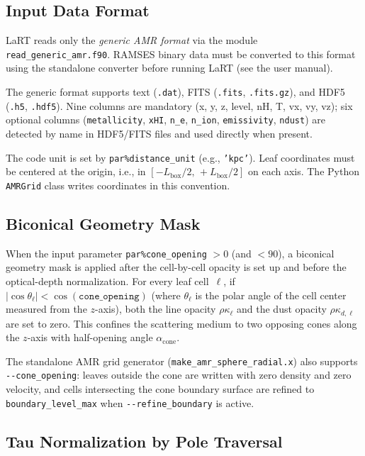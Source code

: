 \documentclass[english,a4paper]{my_memo}
\begin{document}
\subsection{Input Data Format}

LaRT reads only the \emph{generic AMR format} via the module
\texttt{read\_generic\_amr.f90}.  RAMSES binary data must be converted
to this format using the standalone converter before running LaRT (see
the user manual).

The generic format supports text (\texttt{.dat}), FITS (\texttt{.fits},
\texttt{.fits.gz}), and HDF5 (\texttt{.h5}, \texttt{.hdf5}).  Nine
columns are mandatory (x, y, z, level, nH, T, vx, vy, vz); six
optional columns (\texttt{metallicity}, \texttt{xHI}, \texttt{n\_e},
\texttt{n\_ion}, \texttt{emissivity}, \texttt{ndust}) are detected
by name in HDF5/FITS files and used directly when present.

The code unit is set by \texttt{par\%distance\_unit} (e.g., \texttt{'kpc'}).
Leaf coordinates must be centered at the origin,
i.e., in $[-L_\mathrm{box}/2,\,+L_\mathrm{box}/2]$ on each axis.
The Python \texttt{AMRGrid} class writes coordinates in this convention.

\subsection{Biconical Geometry Mask}
\label{sec:cone_mask}

When the input parameter \texttt{par\%cone\_opening} $> 0$ (and $< 90$),
a biconical geometry mask is applied after the cell-by-cell opacity is set up
and before the optical-depth normalization.  For every leaf cell~$\ell$,
if $|\cos\theta_\ell| < \cos(\texttt{cone\_opening})$
(where $\theta_\ell$ is the polar angle of the cell center measured from
the $z$-axis), both the line opacity $\rho\kappa_\ell$ and the dust
opacity $\rho\kappa_{d,\ell}$ are set to zero.  This confines the
scattering medium to two opposing cones along the $z$-axis with
half-opening angle $\alpha_\mathrm{cone}$.

The standalone AMR grid generator (\texttt{make\_amr\_sphere\_radial.x})
also supports \texttt{-{}-cone\_opening}: leaves outside the cone are
written with zero density and zero velocity, and cells intersecting the
cone boundary surface are refined to \texttt{boundary\_level\_max} when
\texttt{-{}-refine\_boundary} is active.

\subsection{Tau Normalization by Pole Traversal}
\label{sec:taunorm}
\end{document}

